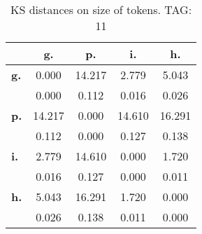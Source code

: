 \begin{table}[h!]
\begin{center}
\begin{tabular}{| l || c | c | c | c |}\hline
 & {\bf g.} & {\bf p.} & {\bf i.} & {\bf h.} \\\hline\hline
{\bf g.} & 0.000 & 14.217 & 2.779 & 5.043 \\
{\bf } & 0.000 & 0.112 & 0.016 & 0.026 \\\hline
{\bf p.} & 14.217 & 0.000 & 14.610 & 16.291 \\
{\bf } & 0.112 & 0.000 & 0.127 & 0.138 \\\hline
{\bf i.} & 2.779 & 14.610 & 0.000 & 1.720 \\
{\bf } & 0.016 & 0.127 & 0.000 & 0.011 \\\hline
{\bf h.} & 5.043 & 16.291 & 1.720 & 0.000 \\
{\bf } & 0.026 & 0.138 & 0.011 & 0.000 \\\hline
\end{tabular}
\caption{KS distances on size of tokens. TAG: 11}
\end{center}
\end{table}
